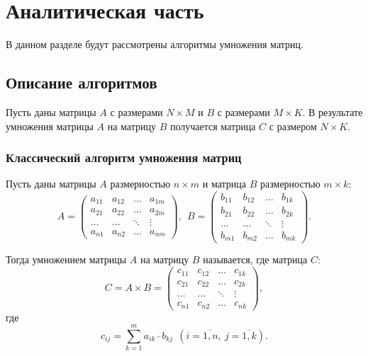 \chapter{Аналитическая часть}

В данном разделе будут рассмотрены алгоритмы умножения матриц.

\section{Описание алгоритмов}

Пусть даны матрицы $A$ с размерами $N\times M$ и  $B$ с размерами $M\times K$.
В результате умножения матрицы $A$ на матрицу $B$ получается матрица  $C$ с размером
$N\times K$.


\subsection{Классический алгоритм умножения матриц}


Пусть даны матрицы $A$ размерностью  $n\times m$ и матрица $B$ размерностью  $m\times k$:
\begin{equation}
    A = 
\begin{pmatrix}
    a_{11} & a_{12} & \ldots & a_{1m} \\
    a_{21} & a_{22} & \ldots & a_{2m} \\
    \hdots & \hdots & \ddots & \vdots \\
    a_{n1} & a_{n2} & \ldots & a_{nm}
\end{pmatrix}, \ \
    B = 
\begin{pmatrix}
    b_{11} & b_{12} & \ldots & b_{1k} \\
    b_{21} & b_{22} & \ldots & b_{2k} \\
    \hdots & \hdots & \ddots & \vdots \\
    b_{m1} & b_{m2} & \ldots & b_{mk}
\end{pmatrix}.
\end{equation}

\medskip

Тогда умножением матрицы $A$ на матрицу  $B$ называется, где матрица $C$:
\begin{equation}
    C = A\times B =
\begin{pmatrix}
    c_{11} & c_{12} & \ldots & c_{1k} \\
    c_{21} & c_{22} & \ldots & c_{2k} \\
    \hdots & \hdots & \ddots & \vdots \\
    c_{n1} & c_{n2} & \ldots & c_{nk}
\end{pmatrix},
\end{equation}
где
\begin{equation}
    c_{ij} = \sum\limits_{k=1}^{m} a_{ik} \cdot b_{kj} \ \ (i = \overline{1,n}, \
    j = \overline{1,k}).
\end{equation}


